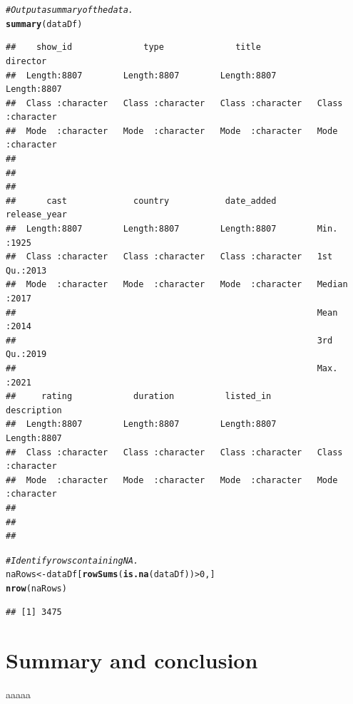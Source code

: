 \documentclass[12pt]{report}\usepackage[]{graphicx}\usepackage[]{xcolor}
\makeatletter
\newcommand{\hlnum}[1]{\textcolor[rgb]{0.686,0.059,0.569}{#1}}%
\newcommand{\hlcom}[1]{\textcolor[rgb]{0.678,0.584,0.686}{\textit{#1}}}%
\newcommand{\hlopt}[1]{\textcolor[rgb]{0,0,0}{#1}}%
\newcommand{\hlstd}[1]{\textcolor[rgb]{0.345,0.345,0.345}{#1}}%
\newcommand{\hlkwb}[1]{\textcolor[rgb]{0.69,0.353,0.396}{#1}}%
\newcommand{\hlkwd}[1]{\textcolor[rgb]{0.737,0.353,0.396}{\textbf{#1}}}%
\newenvironment{kframe}{%
 \def\at@end@of@kframe{}%
 \ifinner\ifhmode%
  \def\at@end@of@kframe{\end{minipage}}%
  \begin{minipage}{\columnwidth}%
 \fi\fi%
 \def\FrameCommand##1{\hskip\@totalleftmargin \hskip-\fboxsep
 \colorbox{shadecolor}{##1}\hskip-\fboxsep
     \hskip-\linewidth \hskip-\@totalleftmargin \hskip\columnwidth}%
 \MakeFramed {\advance\hsize-\width
   \@totalleftmargin\z@ \linewidth\hsize
   \@setminipage}}%
 {\par\unskip\endMakeFramed%
 \at@end@of@kframe}
\newenvironment{knitrout}{}{} %
\makeatother
\begin{document}
\begin{knitrout}
\begin{kframe}
\begin{alltt}
\hlcom{# Output a summary of the data.}
\hlkwd{summary}\hlstd{(dataDf)}
\end{alltt}
\begin{verbatim}
##    show_id              type              title             director        
##  Length:8807        Length:8807        Length:8807        Length:8807       
##  Class :character   Class :character   Class :character   Class :character  
##  Mode  :character   Mode  :character   Mode  :character   Mode  :character  
##                                                                             
##                                                                             
##                                                                             
##      cast             country           date_added         release_year 
##  Length:8807        Length:8807        Length:8807        Min.   :1925  
##  Class :character   Class :character   Class :character   1st Qu.:2013  
##  Mode  :character   Mode  :character   Mode  :character   Median :2017  
##                                                           Mean   :2014  
##                                                           3rd Qu.:2019  
##                                                           Max.   :2021  
##     rating            duration          listed_in         description       
##  Length:8807        Length:8807        Length:8807        Length:8807       
##  Class :character   Class :character   Class :character   Class :character  
##  Mode  :character   Mode  :character   Mode  :character   Mode  :character  
##                                                                             
##                                                                             
## 
\end{verbatim}
\begin{alltt}
\hlcom{# Identify rows containing NA.}
\hlstd{naRows} \hlkwb{<-} \hlstd{dataDf[}\hlkwd{rowSums}\hlstd{(}\hlkwd{is.na}\hlstd{(dataDf))} \hlopt{>} \hlnum{0}\hlstd{,]}
\hlkwd{nrow}\hlstd{(naRows)}
\end{alltt}
\begin{verbatim}
## [1] 3475
\end{verbatim}
\end{kframe}
\end{knitrout}

    \chapter{Summary and conclusion}

    aaaaa
    
    \printbibliography{}
\end{document}
